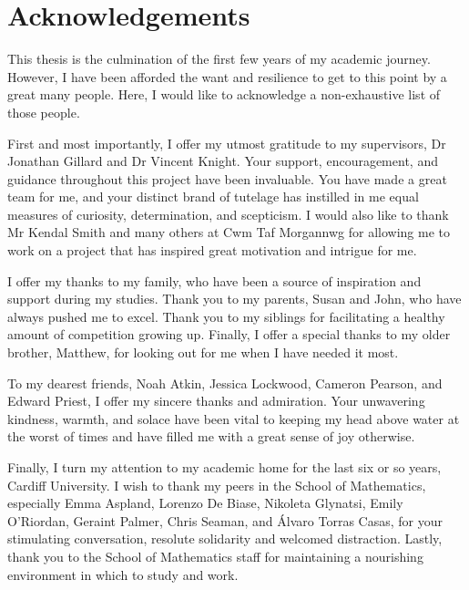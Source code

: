\chapter*{Acknowledgements}

This thesis is the culmination of the first few years of my academic journey.
However, I have been afforded the want and resilience to get to this point by
a great many people. Here, I would like to acknowledge a non-exhaustive list of
those people.

First and most importantly, I offer my utmost gratitude to my supervisors, Dr
Jonathan Gillard and Dr Vincent Knight. Your support, encouragement, and
guidance throughout this project have been invaluable. You have made a great
team for me, and your distinct brand of tutelage has instilled in me equal
measures of curiosity, determination, and scepticism. I would also like to thank
Mr Kendal Smith and many others at Cwm Taf Morgannwg for allowing me to work on
a project that has inspired great motivation and intrigue for me.

I offer my thanks to my family, who have been a source of inspiration and
support during my studies. Thank you to my parents, Susan and John, who have
always pushed me to excel. Thank you to my siblings for facilitating a healthy
amount of competition growing up. Finally, I offer a special thanks to my older
brother, Matthew, for looking out for me when I have needed it most.

To my dearest friends, Noah Atkin, Jessica Lockwood, Cameron Pearson, and Edward
Priest, I offer my sincere thanks and admiration. Your unwavering kindness,
warmth, and solace have been vital to keeping my head above water at the worst
of times and have filled me with a great sense of joy otherwise.

Finally, I turn my attention to my academic home for the last six or so years,
Cardiff University. I wish to thank my peers in the School of Mathematics,
especially Emma Aspland, Lorenzo De Biase, Nikoleta Glynatsi, Emily O'Riordan,
Geraint Palmer, Chris Seaman, and \'{A}lvaro Torras Casas, for your stimulating
conversation, resolute solidarity and welcomed distraction. Lastly, thank you to
the School of Mathematics staff for maintaining a nourishing environment in
which to study and work. 
